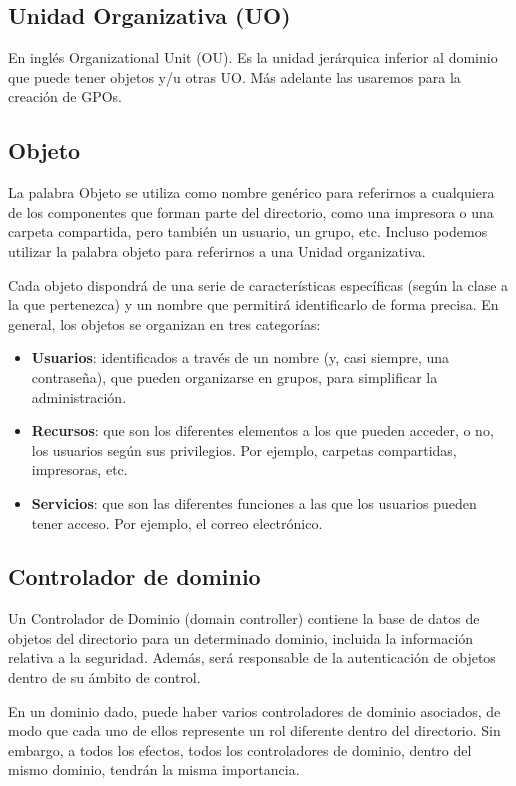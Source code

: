 \subsection{Unidad Organizativa (UO)}
En inglés Organizational Unit (OU). Es la unidad jerárquica inferior al dominio que puede tener objetos y/u otras UO. Más adelante las usaremos para la creación de GPOs.



\subsection{Objeto}
La palabra Objeto se utiliza como nombre genérico para referirnos a cualquiera de los componentes que forman parte del directorio, como una impresora o una carpeta compartida, pero también un usuario, un grupo, etc. Incluso podemos utilizar la palabra objeto para referirnos a una Unidad organizativa.

Cada objeto dispondrá de una serie de características específicas (según la clase a la que pertenezca) y un nombre que permitirá identificarlo de forma precisa. En general, los objetos se organizan en tres categorías:
\begin{itemize}
    \item \textbf{Usuarios}: identificados a través de un nombre (y, casi siempre, una contraseña), que pueden organizarse en grupos, para simplificar la administración.
    \item \textbf{Recursos}: que son los diferentes elementos a los que pueden acceder, o no, los usuarios según sus privilegios. Por ejemplo, carpetas compartidas, impresoras, etc.
    \item \textbf{Servicios}: que son las diferentes funciones a las que los usuarios pueden tener acceso. Por ejemplo, el correo electrónico.
\end{itemize}


\subsection{Controlador de dominio}
Un Controlador de Dominio (domain controller) contiene la base de datos de objetos del directorio para un determinado dominio, incluida la información relativa a la seguridad. Además, será responsable de la autenticación de objetos dentro de su ámbito de control.

En un dominio dado, puede haber varios controladores de dominio asociados, de modo que cada uno de ellos represente un rol diferente dentro del directorio. Sin embargo, a todos los efectos, todos los controladores de dominio, dentro del mismo dominio, tendrán la misma importancia.


